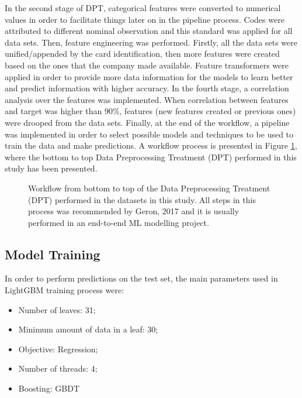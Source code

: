 \documentclass[letterpaper, 10 pt, conference]{ieeeconf}  %
\begin{document}
In the second stage of DPT, categorical features were converted to numerical values in order to facilitate things later on in the pipeline process. Codes were attributed to different nominal observation and this standard was applied for all data sets. Then, feature engineering was performed. Firstly, all the data sets were unified/appended by the card identification, then more features were created based on the ones that the company made available. Feature transformers were applied in order to provide more data information for the models to learn better and predict information with higher accuracy. In the fourth stage, a correlation analysis over the features was implemented. When correlation between features and target was higher than 90\%, features (new features created or previous ones) were drooped from the data sets. Finally, at the end of the workflow, a pipeline was implemented in order to select possible models and techniques to be used to train the data and make predictions. A workflow process is presented in Figure \ref{workflow}, where the bottom to top Data Preprocessing Treatment (DPT) performed in this study has been presented. \\


\begin{figure}[thpb]
\centering
{}
\caption{Workflow from bottom to top of the Data Preprocessing Treatment (DPT) performed in the datasets in this study. All steps in this process was recommended by Geron, 2017 \cite{Geron} and it is usually performed in an end-to-end ML modelling project.}
\label{workflow}
\end{figure}  
  

\subsection{Model Training}
In order to perform predictions on the test set, the main parameters used in LightGBM training process were:

\begin{itemize}
\item Number of leaves: 31;
\item Minimum amount of data in a leaf: 30;
\item Objective: Regression;
\item Number of threads: 4;
\item Boosting: GBDT
\end{itemize}
\end{document}
